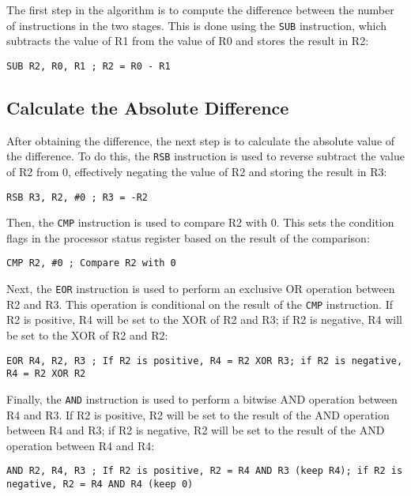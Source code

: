 The first step in the algorithm is to compute the difference between the number of instructions in the two stages. This is done using the \texttt{SUB} instruction, which subtracts the value of R1 from the value of R0 and stores the result in R2:

\begin{verbatim}
SUB R2, R0, R1 ; R2 = R0 - R1
\end{verbatim}

\subsection{Calculate the Absolute Difference}

After obtaining the difference, the next step is to calculate the absolute value of the difference. To do this, the \texttt{RSB} instruction is used to reverse subtract the value of R2 from 0, effectively negating the value of R2 and storing the result in R3:

\begin{verbatim}
RSB R3, R2, #0 ; R3 = -R2
\end{verbatim}

Then, the \texttt{CMP} instruction is used to compare R2 with 0. This sets the condition flags in the processor status register based on the result of the comparison:

\begin{verbatim}
CMP R2, #0 ; Compare R2 with 0
\end{verbatim}

Next, the \texttt{EOR} instruction is used to perform an exclusive OR operation between R2 and R3. This operation is conditional on the result of the \texttt{CMP} instruction. If R2 is positive, R4 will be set to the XOR of R2 and R3; if R2 is negative, R4 will be set to the XOR of R2 and R2:

\begin{verbatim}
EOR R4, R2, R3 ; If R2 is positive, R4 = R2 XOR R3; if R2 is negative, R4 = R2 XOR R2
\end{verbatim}

Finally, the \texttt{AND} instruction is used to perform a bitwise AND operation between R4 and R3. If R2 is positive, R2 will be set to the result of the AND operation between R4 and R3; if R2 is negative, R2 will be set to the result of the AND operation between R4 and R4:

\begin{verbatim}
AND R2, R4, R3 ; If R2 is positive, R2 = R4 AND R3 (keep R4); if R2 is negative, R2 = R4 AND R4 (keep 0)
\end{verbatim}

